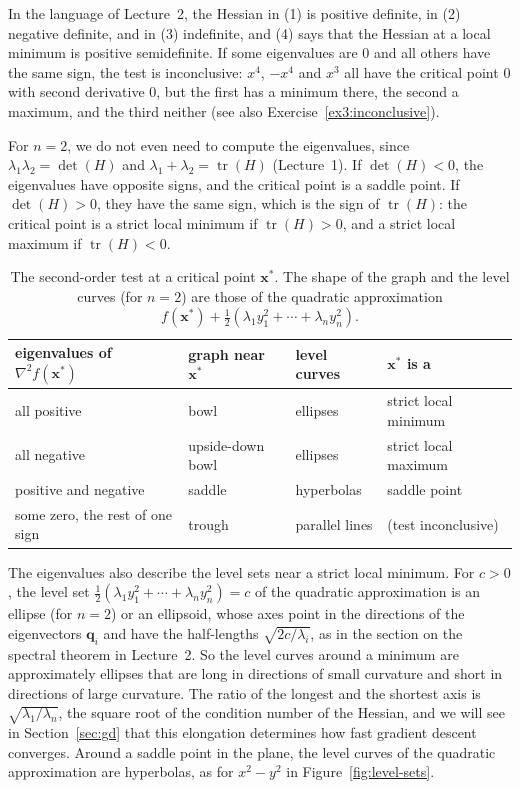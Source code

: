 \documentclass[11pt]{article}
\theoremstyle{definition}
\theoremstyle{plain}
\theoremstyle{remark}
\DeclareMathOperator{\tr}{tr}
\begin{document}
In the language of Lecture~2, the Hessian in (1) is positive definite, in (2) negative definite, and in (3) indefinite, and (4) says that the Hessian at a local minimum is positive semidefinite. If some eigenvalues are $0$ and all others have the same sign, the test is inconclusive: $x^4$, $-x^4$ and $x^3$ all have the critical point $0$ with second derivative $0$, but the first has a minimum there, the second a maximum, and the third neither (see also Exercise~\ref{ex3:inconclusive}).

For $n = 2$, we do not even need to compute the eigenvalues, since $\lambda_1\lambda_2 = \det(H)$ and $\lambda_1 + \lambda_2 = \tr(H)$ (Lecture~1). If $\det(H) < 0$, the eigenvalues have opposite signs, and the critical point is a saddle point. If $\det(H) > 0$, they have the same sign, which is the sign of $\tr(H)$: the critical point is a strict local minimum if $\tr(H) > 0$, and a strict local maximum if $\tr(H) < 0$.

\begin{table}[ht]
    \centering
    \renewcommand{\arraystretch}{1.3}
    \begin{tabular}{llll}
        \hline
        eigenvalues of $\nabla^2 f(\mathbf{x}^*)$ & graph near $\mathbf{x}^*$ & level curves & $\mathbf{x}^*$ is a \\
        \hline
        all positive & bowl & ellipses & strict local minimum \\
        all negative & upside-down bowl & ellipses & strict local maximum \\
        positive and negative & saddle & hyperbolas & saddle point \\
        some zero, the rest of one sign & trough & parallel lines & (test inconclusive) \\
        \hline
    \end{tabular}
    \caption{The second-order test at a critical point $\mathbf{x}^*$. The shape of the graph and the level curves (for $n = 2$) are those of the quadratic approximation $f(\mathbf{x}^*) + \frac{1}{2}(\lambda_1 y_1^2 + \cdots + \lambda_n y_n^2)$.}
    \label{tab:second-order}
\end{table}

The eigenvalues also describe the level sets near a strict local minimum. For $c > 0$, the level set $\frac{1}{2}(\lambda_1 y_1^2 + \cdots + \lambda_n y_n^2) = c$ of the quadratic approximation is an ellipse (for $n = 2$) or an ellipsoid, whose axes point in the directions of the eigenvectors $\mathbf{q}_i$ and have the half-lengths $\sqrt{2c/\lambda_i}$, as in the section on the spectral theorem in Lecture~2. So the level curves around a minimum are approximately ellipses that are long in directions of small curvature and short in directions of large curvature. The ratio of the longest and the shortest axis is $\sqrt{\lambda_1/\lambda_n}$, the square root of the condition number of the Hessian, and we will see in Section~\ref{sec:gd} that this elongation determines how fast gradient descent converges. Around a saddle point in the plane, the level curves of the quadratic approximation are hyperbolas, as for $x^2 - y^2$ in Figure~\ref{fig:level-sets}.
\end{document}
